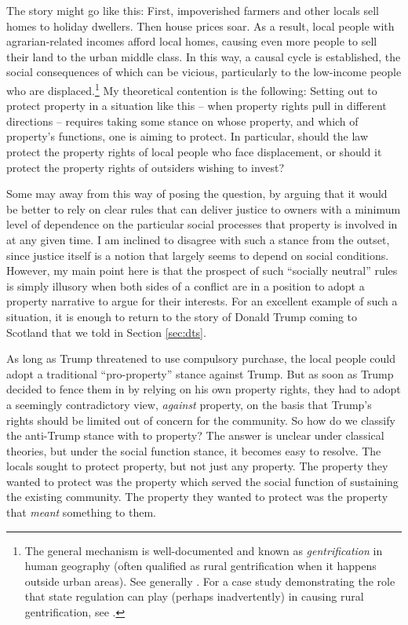 The story might go like this: First, impoverished farmers and other locals sell homes to holiday dwellers. Then house prices soar. As a result, local people with agrarian-related incomes  afford local homes, causing even more people to sell their land to the urban middle class. In this way, a causal cycle is established, the social consequences of which can be vicious, particularly to the low-income people who are displaced.\footnote{The general mechanism is well-documented and known as {\it gentrification} in human geography (often qualified as rural gentrification when it happens outside urban areas). See generally \cite{weesep94,phillips93,slater06}. For a case study demonstrating the role that state regulation can play (perhaps inadvertently) in causing rural gentrification, see \cite[1027-1030]{darling05}.} My theoretical contention is the following: Setting out to protect property in a situation like this -- when property rights pull in different directions -- requires taking some stance on whose property, and which of property's functions, one is aiming to protect. In particular, should the law protect the property rights of local people who face displacement, or should it protect the property rights of outsiders wishing to invest?

Some may  away from this way of posing the question, by arguing that it would be better to rely on clear rules that can deliver justice to owners with a minimum level of dependence on the particular social processes that property is involved in at any given time. I am inclined to disagree with such a stance from the outset, since justice itself is a notion that largely seems to depend on social conditions. However, my main point here is that the prospect of such ``socially neutral'' rules is simply illusory when both sides of a conflict are in a position to adopt a property narrative to argue for their interests. For an excellent example of such a situation, it is enough to return to the story of Donald Trump coming to Scotland that we told in Section \ref{sec:dts}.

As long as Trump threatened to use compulsory purchase, the local people could adopt a traditional ``pro-property'' stance against Trump. But as soon as Trump decided to fence them in by relying on his own property rights, they had to adopt a seemingly contradictory view, {\it against} property, on the basis that Trump's rights should be limited out of concern for the community. So how do we classify the anti-Trump stance with  to property? The answer is unclear under classical theories, but under the social function stance, it becomes easy to resolve. The locals sought to protect property, but not just any property. The property they wanted to protect was the property which served the social function of sustaining the existing community. The property they wanted to protect was the property that {\it meant} something to them.

